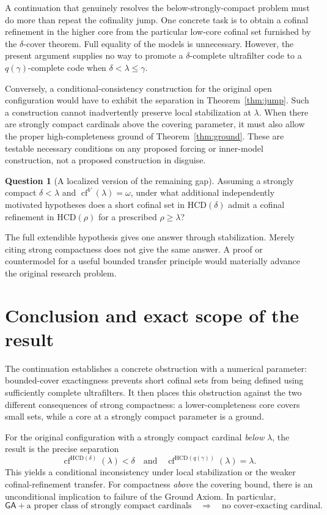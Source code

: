 \documentclass[11pt,letterpaper]{article}
\theoremstyle{definition}
\newcommand{\cf}{\operatorname{cf}}
\newcommand{\HCD}{\mathrm{HCD}}
\newcommand{\GA}{\mathsf{GA}}
\newtheorem{question}[definition]{Question}
\begin{document}
A continuation that genuinely resolves the below-strongly-compact problem must do more than repeat the cofinality jump. One concrete task is to obtain a cofinal refinement in the higher core from the particular low-core cofinal set furnished by the $\delta$-cover theorem. Full equality of the models is unnecessary. However, the present argument supplies no way to promote a $\delta$-complete ultrafilter code to a $q(\gamma)$-complete code when $\delta<\lambda\leq\gamma$.

Conversely, a conditional-consistency construction for the original open configuration would have to exhibit the separation in Theorem~\ref{thm:jump}. Such a construction cannot inadvertently preserve local stabilization at $\lambda$. When there are strongly compact cardinals above the covering parameter, it must also allow the proper high-completeness ground of Theorem~\ref{thm:ground}. These are testable necessary conditions on any proposed forcing or inner-model construction, not a proposed construction in disguise.

\begin{question}[A localized version of the remaining gap]
Assuming a strongly compact $\delta<\lambda$ and $\cf^V(\lambda)=\omega$, under what additional independently motivated hypotheses does a short cofinal set in $\HCD(\delta)$ admit a cofinal refinement in $\HCD(\rho)$ for a prescribed $\rho\geq\lambda$?
\end{question}

The full extendible hypothesis gives one answer through stabilization. Merely citing strong compactness does not give the same answer. A proof or countermodel for a useful bounded transfer principle would materially advance the original research problem.

\section{Conclusion and exact scope of the result}\label{sec:conclusion}

The continuation establishes a concrete obstruction with a numerical parameter: bounded-cover exactingness prevents short cofinal sets from being defined using sufficiently complete ultrafilters. It then places this obstruction against the two different consequences of strong compactness: a lower-completeness core covers small sets, while a core at a strongly compact parameter is a ground.

For the original configuration with a strongly compact cardinal \emph{below} $\lambda$, the result is the precise separation
\[
 \cf^{\HCD(\delta)}(\lambda)<\delta
 \quad\text{and}\quad
 \cf^{\HCD(q(\gamma))}(\lambda)=\lambda.
\]
This yields a conditional inconsistency under local stabilization or the weaker cofinal-refinement transfer. For compactness \emph{above} the covering bound, there is an unconditional implication to failure of the Ground Axiom. In particular,
\[
 \GA+\text{a proper class of strongly compact cardinals}
 \quad\Longrightarrow\quad
 \text{no cover-exacting cardinal}.
\]
\end{document}
